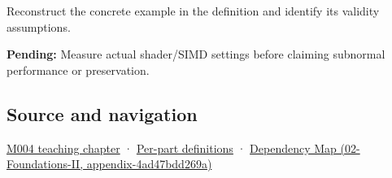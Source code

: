 Reconstruct the concrete example in the definition and identify its validity assumptions.

\textbf{Pending:} Measure actual shader/SIMD settings before claiming subnormal performance or preservation.

\subsection{Source and navigation}\label{source-and-navigation}

\href{Continuous\%20Notes/Computing\%20Foundations\%20-\%20From\%20Bits\%20to\%20C++\%20and\%20Systems\%20APIs\#A\%20stretching\%20ruler\%20for\%20real-valued\%20quantities}{M004 teaching chapter} · \hyperref[appendix-fd090d982a15]{Per-part definitions} · \href{}{Dependency Map (02-Foundations-II, appendix-4ad47bdd269a)}
